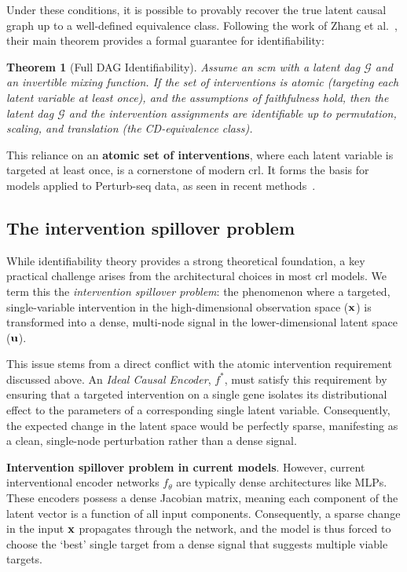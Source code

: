 \documentclass[10pt,letterpaper]{article}
\def\gG{{\mathcal{G}}}\def\gH{{\mathcal{H}}}\def\gI{{\mathcal{I}}}
\newtheorem{theorem}{Theorem}[section]
\theoremstyle{definition}
\theoremstyle{remark}
\newcommand{\variables}{\rvx}
\newcommand{\graph}{\gG}
\newcommand{\latentcausalvars}{\rvu}
\newcommand{\idealencoder}{f^*}
\newcommand{\practicalencoder}{f_\theta}
\begin{document}
Under these conditions, it is possible to provably recover the true latent causal graph up to a well-defined equivalence class.
Following the work of Zhang et al.~\cite{zhang2023identifiability}, their main theorem provides a formal guarantee for identifiability:

\begin{theorem}[Full DAG Identifiability]\label{thm:zhang_full_dag}
Assume an \gls{scm} with a latent \gls{dag} $\graph$ and an invertible mixing function.
If the set of interventions is atomic (targeting each latent variable at least once), and the assumptions of faithfulness hold, then the latent \gls{dag} $\graph$ and the intervention assignments are identifiable up to permutation, scaling, and translation (the CD-equivalence class).
\end{theorem}

This reliance on an \textbf{atomic set of interventions}, where each latent variable is targeted at least once, is a cornerstone of modern \gls{crl}.
It forms the basis for models applied to Perturb-seq data, as seen in recent methods~\cite{zhang2023identifiability,de2025interpretable}.

\subsection*{The intervention spillover problem}
While identifiability theory provides a strong theoretical foundation, a key practical challenge arises from the architectural choices in most \gls{crl} models.
We term this the \emph{intervention spillover problem}: the phenomenon where a targeted, single-variable intervention in the high-dimensional observation space ($\variables$) is transformed into a dense, multi-node signal in the lower-dimensional latent space ($\latentcausalvars$).

This issue stems from a direct conflict with the atomic intervention requirement discussed above.
An \emph{Ideal Causal Encoder}, $\idealencoder$, must satisfy this requirement by ensuring that a targeted intervention on a single gene isolates its distributional effect to the parameters of a corresponding single latent variable.
Consequently, the expected change in the latent space would be perfectly sparse, manifesting as a clean, single-node perturbation rather than a dense signal.

\textbf{Intervention spillover problem in current models}. However, current interventional encoder networks $\practicalencoder$ are typically dense architectures like MLPs.
These encoders possess a dense Jacobian matrix, meaning each component of the latent vector is a function of all input components.
Consequently, a sparse change in the input $\variables$ propagates through the network, and the model is thus forced to choose the `best' single target from a dense signal that suggests multiple viable targets.
\end{document}
